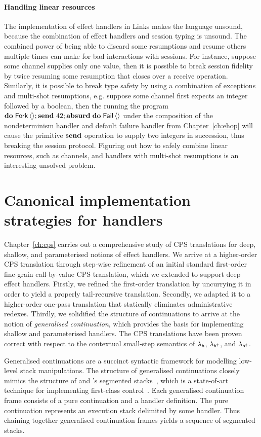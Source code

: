 \documentclass[12pt,phd,lfcs,twoside,openright,logo,leftchapter,normalheadings]{infthesis}
\theoremstyle{plain}
\theoremstyle{definition}
\begin{document}
\paragraph{Handling linear resources} The implementation of effect
handlers in Links makes the language unsound, because the \naive{}
combination of effect handlers and session typing is unsound. The
combined power of being able to discard some resumptions and resume
others multiple times can make for bad interactions with sessions. For
instance, suppose some channel supplies only one value, then it is
possible to break session fidelity by twice resuming some resumption
that closes over a receive operation. Similarly, it is possible to
break type safety by using a combination of exceptions and multi-shot
resumptions, e.g. suppose some channel first expects an integer
followed by a boolean, then the running the program
$\mathbf{do}\;\mathsf{Fork}\,\langle  \rangle;\mathbf{send}~42;\mathbf{absurd}\;\mathbf{do}\;\mathsf{Fail}\,\langle  \rangle$ under
the composition of the nondeterminism handler and default failure
handler from Chapter~\ref{ch:ehop} will cause the primitive
$\mathbf{send}$ operation to supply two integers in succession, thus
breaking the session protocol. Figuring out how to safely combine
linear resources, such as channels, and handlers with multi-shot
resumptions is an interesting unsolved problem.

\section{Canonical implementation strategies for handlers}
Chapter~\ref{ch:cps} carries out a comprehensive study of CPS
translations for deep, shallow, and parameterised notions of effect
handlers.
%
We arrive at a higher-order CPS translation through step-wise
refinement of an initial standard first-order fine-grain call-by-value
CPS translation, which we extended to support deep effect
handlers. Firstly, we refined the first-order translation by
uncurrying it in order to yield a properly tail-recursive
translation. Secondly, we adapted it to a higher-order one-pass
translation that statically eliminates administrative
redexes. Thirdly, we solidified the structure of continuations to
arrive at the notion of \emph{generalised continuation}, which
provides the basis for implementing shallow and parameterised
handlers.
%
The CPS translations have been proven correct with respect to the
contextual small-step semantics of $\lambda_{\mathsf{h}}$, $\lambda_{\mathsf{h^\dagger}}$, and $\lambda_{\mathsf{h^{\ddagger}}}$.

Generalised continuations are a succinct syntactic framework for
modelling low-level stack manipulations. The structure of generalised
continuations closely mimics the structure of \citeauthor{HiebDB90}
and \citeauthor{BruggemanWD96}'s segmented
stacks~\cite{HiebDB90,BruggemanWD96}, which is a state-of-art
technique for implementing first-class
control~\cite{FlattDDKMSTZ19}. Each generalised continuation frame
consists of a pure continuation and a handler definition. The pure
continuation represents an execution stack delimited by some
handler. Thus chaining together generalised continuation frames yields
a sequence of segmented stacks.
\end{document}
